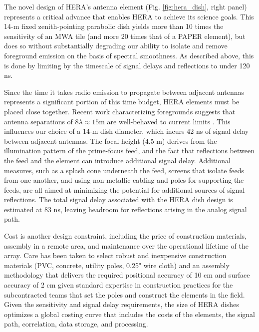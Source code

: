 \documentclass[preprint]{aastex}
\begin{document}
The novel design of HERA's antenna element
(Fig. \ref{fig:hera_dish}, right panel) represents a critical advance
that enables HERA to achieve its science goals.  This 14-m
fixed zenith-pointing parabolic dish yields more than 10 times the
sensitivity of an MWA tile (and more 20 times
that of a PAPER element), but does so without substantially degrading
our ability to isolate and remove foreground emission on the basis of
spectral smoothness.  As described above, this is done by limiting by 
the timescale of signal delays and reflections to under 120 ns.

Since the time it takes radio emission to propagate between adjacent antennas 
represents a significant portion of this time budget, HERA elements must be placed close together.
Recent work characterizing foregrounds suggests that 
antenna separations of $8\lambda \approx 15$m are
well-behaved to current limits \citep{pober_et_al2013,parsons_et_al2013}. This influences our
choice of a 14-m dish diameter,
which incurs 42 ns of signal delay between adjacent antennas.
The focal height (4.5 m) derives from the illumination pattern of the prime-focus
feed, and the fact that reflections
between the feed and the element%
can introduce additional signal delay. 
Additional measures, such as a splash cone underneath the feed, screens that isolate feeds from one another, and using
non-metallic cabling and poles for supporting the feeds, are all aimed at minimizing
the potential for additional sources of signal reflections.
The total signal delay associated with the HERA dish design is estimated at 83 ns, leaving
headroom for reflections arising in the analog signal path.

Cost is another design constraint, including the price of construction
materials, assembly in a remote area, and maintenance over the operational
lifetime of the array.  Care has been taken to select robust and inexpensive
construction materials (PVC, concrete, utility poles, 0.25" wire cloth) and an assembly methodology that delivers the required positional
accuracy of 10 cm and surface accuracy of 2 cm given standard expertise in construction
practices for the subcontracted teams that set the poles and construct the
elements in the field.  
Given the sensitivity and signal delay requirements, the size of HERA
dishes optimizes a global costing curve that includes the costs of the elements,
the signal path, correlation, data storage, and processing.
\end{document}
